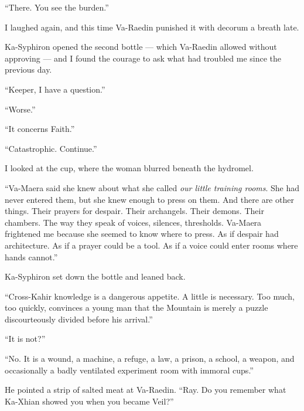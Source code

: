 ``There. You see the burden.''\par

I laughed again, and this time Va-Raedin punished it with decorum a breath late.\par

Ka-Syphiron opened the second bottle --- which Va-Raedin allowed without approving --- and I found the courage to ask what had troubled me since the previous day.\par

``Keeper, I have a question.''\par

``Worse.''\par

``It concerns Faith.''\par

``Catastrophic. Continue.''\par

I looked at the cup, where the woman blurred beneath the hydromel.\par

``Va-Maera said she knew about what she called \textit{our little training rooms}. She had never entered them, but she knew enough to press on them.
And there are other things. Their prayers for despair. Their archangels. Their demons. Their chambers. The way they speak of voices, silences, thresholds.
Va-Maera frightened me because she seemed to know where to press. As if despair had architecture. As if a prayer could be a tool. As if a voice could enter rooms where hands cannot.''\par

Ka-Syphiron set down the bottle and leaned back.\par

``Cross-Kahir knowledge is a dangerous appetite. A little is necessary. Too much, too quickly, convinces a young man that the Mountain is merely a puzzle discourteously divided before his arrival.''\par

``It is not?''\par

``No. It is a wound, a machine, a refuge, a law, a prison, a school, a weapon, and occasionally a badly ventilated experiment room with immoral cups.''\par

He pointed a strip of salted meat at Va-Raedin. ``Ray. Do you remember what Ka-Xhian showed you when you became Veil?''\par

